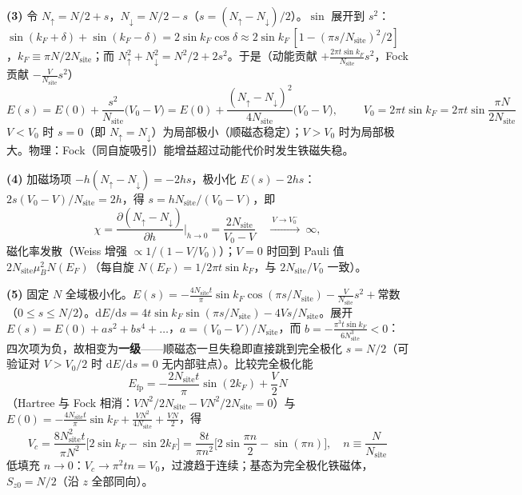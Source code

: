 \textbf{(3)} 令 $N_{\uparrow}=N/2+s$，$N_{\downarrow}=N/2-s$（$s=(N_{\uparrow}-N_{\downarrow})/2$）。$\sin$ 展开到 $s^{2}$：$\sin(k_F{+}\delta)+\sin(k_F{-}\delta)=2\sin k_F\cos\delta\approx2\sin k_F\,[1-(\pi s/N_{\mathrm{site}})^{2}/2]$，$k_F\equiv\pi N/2N_{\mathrm{site}}$；而 $N_{\uparrow}^{2}+N_{\downarrow}^{2}=N^{2}/2+2s^{2}$。于是（动能贡献 $+\frac{2\pi t\sin k_F}{N_{\mathrm{site}}}s^{2}$，Fock 贡献 $-\frac{V}{N_{\mathrm{site}}}s^{2}$）
\begin{equation*}
E(s)=E(0)+\frac{s^{2}}{N_{\mathrm{site}}}\big(V_0-V\big)
=E(0)+\frac{(N_{\uparrow}-N_{\downarrow})^{2}}{4N_{\mathrm{site}}}\big(V_0-V\big),
\qquad
\boxed{\;V_0=2\pi t\sin k_F=2\pi t\sin\frac{\pi N}{2N_{\mathrm{site}}}\;}
\end{equation*}
$V<V_0$ 时 $s=0$（即 $N_{\uparrow}=N_{\downarrow}$）为局部极小（顺磁态稳定）；$V>V_0$ 时为局部极大。物理：Fock（同自旋吸引）能增益超过动能代价时发生铁磁失稳。

\textbf{(4)} 加磁场项 $-h(N_{\uparrow}-N_{\downarrow})=-2hs$，极小化 $E(s)-2hs$：$2s(V_0-V)/N_{\mathrm{site}}=2h$，得 $s=hN_{\mathrm{site}}/(V_0-V)$，即
\begin{equation*}
\chi=\frac{\partial (N_{\uparrow}-N_{\downarrow})}{\partial h}\Big|_{h\to0}
=\frac{2N_{\mathrm{site}}}{V_0-V}
\quad\xrightarrow{\ V\to V_0^{-}\ }\ \infty ,
\end{equation*}
磁化率发散（Weiss 增强 $\propto1/(1-V/V_0)$）；$V=0$ 时回到 Pauli 值 $2N_{\mathrm{site}}\mu_B^{2}N(E_F)$（每自旋 $N(E_F)=1/2\pi t\sin k_F$，与 $2N_{\mathrm{site}}/V_0$ 一致）。

\textbf{(5)} 固定 $N$ 全域极小化。$E(s)=-\frac{4N_{\mathrm{site}}t}{\pi}\sin k_F\cos(\pi s/N_{\mathrm{site}})-\frac{V}{N_{\mathrm{site}}}s^{2}+\text{常数}$（$0\leq s\leq N/2$）。$\mathrm{d}E/\mathrm{d}s=4t\sin k_F\sin(\pi s/N_{\mathrm{site}})-4Vs/N_{\mathrm{site}}$。展开 $E(s)=E(0)+a s^{2}+b s^{4}+\dots$，$a=(V_0-V)/N_{\mathrm{site}}$，而 $b=-\frac{\pi^{3}t\sin k_F}{6N_{\mathrm{site}}^{3}}<0$：四次项为负，故相变为\textbf{一级}——顺磁态一旦失稳即直接跳到完全极化 $s=N/2$（可验证对 $V>V_0/2$ 时 $\mathrm{d}E/\mathrm{d}s=0$ 无内部驻点）。比较完全极化能
\begin{equation*}
E_{\mathrm{fp}}=-\frac{2N_{\mathrm{site}}t}{\pi}\sin(2k_F)+\frac{V}{2}N
\end{equation*}
（Hartree 与 Fock 相消：$V N^{2}/2N_{\mathrm{site}}-VN^{2}/2N_{\mathrm{site}}=0$）与 $E(0)=-\frac{4N_{\mathrm{site}}t}{\pi}\sin k_F+\frac{V N^{2}}{4N_{\mathrm{site}}}+\frac{V N}{2}$，得
\begin{equation*}
\boxed{\;V_c=\frac{8N_{\mathrm{site}}^{2}t}{\pi N^{2}}\big[2\sin k_F-\sin 2k_F\big]
=\frac{8t}{\pi n^{2}}\Big[2\sin\frac{\pi n}{2}-\sin(\pi n)\Big],\quad n\equiv\frac{N}{N_{\mathrm{site}}}\;}
\end{equation*}
低填充 $n\to0$：$V_c\to\pi^{2}tn=V_0$，过渡趋于连续；基态为完全极化铁磁体，\textbf{$S_{z0}=N/2$}（沿 $z$ 全部同向）。


